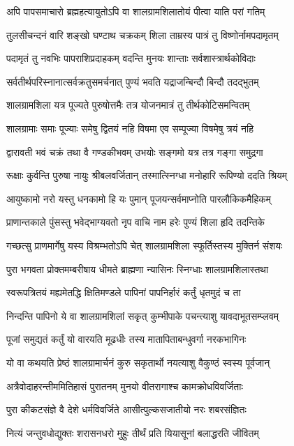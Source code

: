 \twolineshloka
{अपि पापसमाचारो ब्रह्महत्यायुतोऽपि वा}
{शालग्रामशिलातोयं पीत्वा याति परां गतिम्}%

\twolineshloka
{तुलसीचन्दनं वारि शङ्खो घण्टाथ चक्रकम्}
{शिला ताम्रस्य पात्रं तु विष्णोर्नामपदामृतम्}%

\twolineshloka
{पदामृतं तु नवभिः पापराशिप्रदाहकम्}
{वदन्ति मुनयः शान्ताः सर्वशास्त्रार्थकोविदाः}%

\twolineshloka
{सर्वतीर्थपरिस्नानात्सर्वक्रतुसमर्चनात्}
{पुण्यं भवति यद्राजन्बिन्दौ बिन्दौ तदद्भुतम्}%

\twolineshloka
{शालग्रामशिला यत्र पूज्यते पुरुषोत्तमैः}
{तत्र योजनमात्रं तु तीर्थकोटिसमन्वितम्}%

\twolineshloka
{शालग्रामाः समाः पूज्याः समेषु द्वितयं नहि}
{विषमा एव सम्पूज्या विषमेषु त्रयं नहि}%

\twolineshloka
{द्वारावती भवं चक्रं तथा वै गण्डकीभवम्}
{उभयोः सङ्गमो यत्र तत्र गङ्गा समुद्रगा}%

\twolineshloka
{रूक्षाः कुर्वन्ति पुरुषा नायुः श्रीबलवर्जितान्}
{तस्मात्स्निग्धा मनोहारि रूपिण्यो ददति श्रियम्}%

\twolineshloka
{आयुष्कामो नरो यस्तु धनकामो हि यः पुमान्}
{पूजयन्सर्वमाप्नोति पारलौकिकमैहिकम्}%

\twolineshloka
{प्राणान्तकाले पुंसस्तु भवेद्भाग्यवतो नृप}
{वाचि नाम हरेः पुण्यं शिला हृदि तदन्तिके}%

\twolineshloka
{गच्छत्सु प्राणमार्गेषु यस्य विश्रम्भतोऽपि चेत्}
{शालग्रामशिला स्फूर्तिस्तस्य मुक्तिर्न संशयः}%

\twolineshloka
{पुरा भगवता प्रोक्तमम्बरीषाय धीमते}
{ब्राह्मणा न्यासिनः स्निग्धाः शालग्रामशिलास्तथा}%

\twolineshloka
{स्वरूपत्रितयं मह्यमेतद्धि क्षितिमण्डले}
{पापिनां पापनिर्हारं कर्तुं धृतमुदं च ता}%

\twolineshloka
{निन्दन्ति पापिनो ये वा शालग्रामशिलां सकृत्}
{कुम्भीपाके पचन्त्याशु यावदाभूतसम्प्लवम्}%

\twolineshloka
{पूजां समुद्यतं कर्तुं यो वारयति मूढधीः}
{तस्य मातापिताबन्धुवर्गा नरकभागिनः}%

\twolineshloka
{यो वा कथयति प्रेष्ठं शालग्रामार्चनं कुरु}
{सकृतार्थो नयत्याशु वैकुण्ठं स्वस्य पूर्वजान्}%

\twolineshloka
{अत्रैवोदाहरन्तीममितिहासं पुरातनम्}
{मुनयो वीतरागाश्च कामक्रोधविवर्जिताः}%

\twolineshloka
{पुरा कीकटसंज्ञे वै देशे धर्मविवर्जिते}
{आसीत्पुल्कसजातीयो नरः शबरसंज्ञितः}%

\twolineshloka
{नित्यं जन्तुवधोद्युक्तः शरासनधरो मुहुः}
{तीर्थं प्रति यियासूनां बलाद्धरति जीवितम्}%

